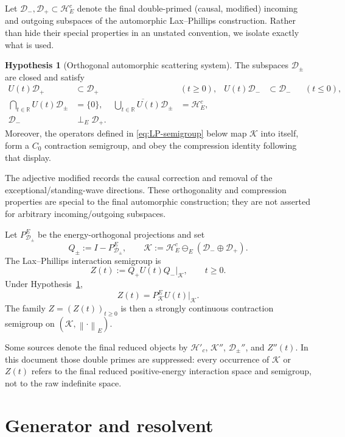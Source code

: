 \documentclass[11pt]{amsart}
\theoremstyle{definition}
\newtheorem{hypothesis}[theorem]{Hypothesis}
\theoremstyle{remark}
\newcommand{\R}{\mathbb R}
\newcommand{\Kcal}{\mathcal K}
\newcommand{\Hcal}{\mathcal H}
\newcommand{\Dcal}{\mathcal D}
\newcommand{\norm}[1]{\left\lVert #1\right\rVert}
\begin{document}
Let $\Dcal_{-},\Dcal_{+}\subset\Hcal_{E}^{c}$ denote the final
double-primed (causal, modified) incoming and outgoing subspaces of the
automorphic Lax--Phillips construction.  Rather than hide their special
properties in an unstated convention, we isolate exactly what is used.

\begin{hypothesis}[Orthogonal automorphic scattering system]\label{hyp:LP}
The subspaces $\Dcal_{\pm}$ are closed and satisfy
\begin{align*}
 U(t)\Dcal_{+}&\subset\Dcal_{+} &&(t\geq0),
 &U(t)\Dcal_{-}&\subset\Dcal_{-} &&(t\leq0),\\
 \bigcap_{t\in\R}U(t)\Dcal_{\pm}&=\{0\},
 &\overline{\bigcup_{t\in\R}U(t)\Dcal_{\pm}}&=\Hcal_{E}^{c},\\
 \Dcal_{-}&\perp_{E}\Dcal_{+}.&&
\end{align*}
Moreover, the operators defined in \eqref{eq:LP-semigroup} below map
$\Kcal$ into itself, form a $C_{0}$ contraction semigroup, and obey the
compression identity following that display.
\end{hypothesis}

The adjective modified records the causal correction and removal of the
exceptional/standing-wave directions.  These orthogonality and compression
properties are special to the final automorphic construction; they are not
asserted for arbitrary incoming/outgoing subspaces.

Let $P_{\Dcal_{\pm}}^{E}$ be the energy-orthogonal projections and set
\[
 Q_{\pm}:=I-P_{\Dcal_{\pm}}^{E},
 \qquad
 \Kcal:=\Hcal_{E}^{c}\ominus_{E}(\Dcal_{-}\oplus\Dcal_{+}).
\]
The Lax--Phillips interaction semigroup is
\begin{equation}\label{eq:LP-semigroup}
 Z(t):=Q_{+}U(t)Q_{-}\big|_{\Kcal},\qquad t\geq0.
\end{equation}
Under Hypothesis~\ref{hyp:LP},
\[
 Z(t)=P_{\Kcal}^{E}U(t)\big|_{\Kcal}.
\]
The family $Z=(Z(t))_{t\geq0}$ is then a strongly continuous contraction
semigroup on $(\Kcal,\norm{\cdot}_{E})$.

Some sources denote the final reduced objects by $\Hcal'_{c}$, $\Kcal''$,
$\Dcal_{\pm}''$, and $Z''(t)$.  In this document those double primes are
suppressed: every occurrence of $\Kcal$ or $Z(t)$ refers to the final reduced
positive-energy interaction space and semigroup, not to the raw indefinite
space.

\section{Generator and resolvent}\label{sec:generator}
\end{document}
